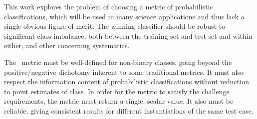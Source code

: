 This work explores the problem of choosing a metric of probabilistic classifications, which will be used in many science applications and thus lack a single obvious figure of merit.
The winning classifier should be robust to significant class imbalance, both between the training set and test set and within either, and other concerning systematics.

The \plasticc\ metric must be well-defined for non-binary classes, going beyond the positive/negative dichotomy inherent to some traditional metrics.
It must also respect the information content of probabilistic classifications without reduction to point estimates of class.
In order for the metric to satisfy the challenge requirements, the metric must return a single, scalar value.
It also must be reliable, giving consistent results for different instantiations of the same test case.

